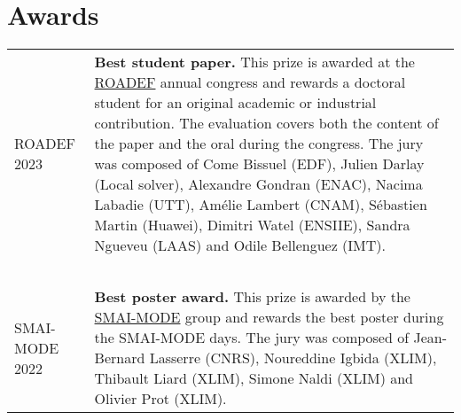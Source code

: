 \section{Awards}

\begin{longtable}[l]{@{}p{}p{}}
    ROADEF 2023 & \textbf{Best student paper.} This prize is awarded at the \href{https://roadef.org}{ROADEF} annual congress and rewards a doctoral student for an original academic or industrial contribution. The evaluation covers both the content of the paper and the oral during the congress. The jury was composed of Come Bissuel (EDF), Julien Darlay (Local solver), Alexandre Gondran (ENAC), Nacima Labadie (UTT), Amélie Lambert (CNAM), Sébastien Martin (Huawei), Dimitri Watel (ENSIIE), Sandra Ngueveu (LAAS) and Odile Bellenguez (IMT). \\~\\

    SMAI-MODE 2022 & \textbf{Best poster award.} This prize is awarded by the \href{http://smai.emath.fr/}{SMAI-MODE} group and rewards the best poster during the SMAI-MODE days. The jury was composed of Jean-Bernard Lasserre (CNRS), Noureddine Igbida (XLIM), Thibault Liard (XLIM), Simone Naldi (XLIM) and Olivier Prot (XLIM). \\
\end{longtable}